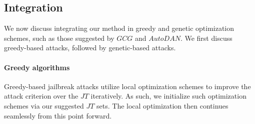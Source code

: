 





\subsection{Integration}
\label{subsec:method_integration}
We now discuss integrating our method in greedy and genetic optimization schemes, such as those suggested by $GCG$ and $AutoDAN$. We first discuss greedy-based attacks, followed by genetic-based attacks.

\paragraph{Greedy algorithms}
Greedy-based jailbreak attacks utilize local optimization schemes to improve the attack criterion over the $JT$ iteratively. As such, we initialize such optimization schemes via our suggested $JT$ sets. The local optimization then continues seamlessly from this point forward.

